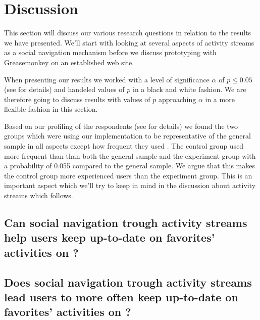 \section{Discussion}

This section will discuss our various research questions in relation
to the results we have presented. We'll start with looking at
several aspects of activity streams as a social navigation
mechanism before we discuss prototyping with Greasemonkey on
an established web site.

When presenting our results we worked with a level of significance
$\alpha$ of $p \leq 0.05$ (see
for details) and handeled values of $p$ in a black and white fashion.
We are therefore going to discuss results with values of $p$ approaching
$\alpha$ in a more flexible fashion in this section.

Based on our profiling of the respondents (see 
 for details)
we found the two groups which were using our implementation to be
representative of the general sample in all aspects except how
frequent they used \urort{}. The control group used \urort{} more
frequent than than both the general sample and the experiment group
with a probability of 0.055 compared to the general sample.
We argue that this makes the control group more experienced
\urort{} users than the experiment group.
This is an important aspect which we'll try to keep in mind in
the discussion about activity streams which follows.

\subsection{%
  Can social navigation trough activity streams help users keep
  up-to-date on favorites' activities on \urort{}?
}




\subsection{%
  Does social navigation trough activity streams lead users to more often keep
  up-to-date on favorites' activities on \urort{}?
}

